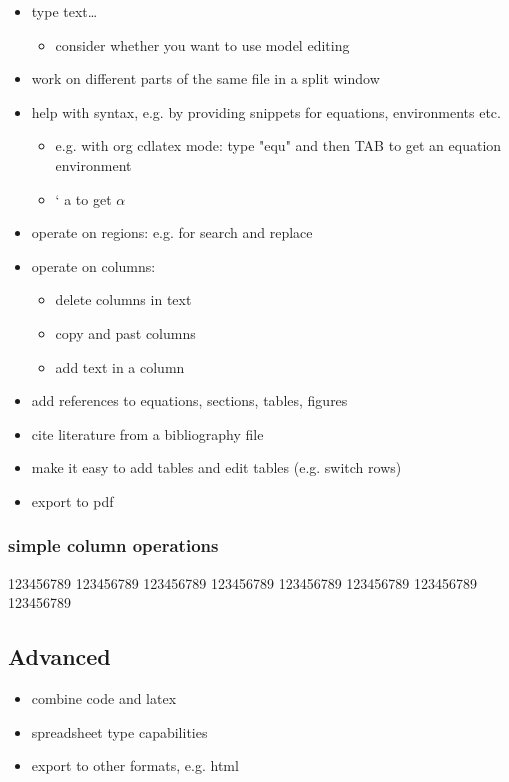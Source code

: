 \documentclass[11pt]{article}
\begin{document}
\begin{itemize}
\item type text\ldots{}
\begin{itemize}
\item consider whether you want to use model editing
\end{itemize}
\item work on different parts of the same file in a split window
\item help with syntax, e.g. by providing snippets for equations, environments etc.
\begin{itemize}
\item e.g. with org cdlatex mode: type "equ" and then TAB to get an equation environment
\item ` a to get \(\alpha\)
\end{itemize}
\item operate on regions: e.g. for search and replace
\item operate on columns:
\begin{itemize}
\item delete columns in text
\item copy and past columns
\item add text in a column
\end{itemize}
\item add references to equations, sections, tables, figures
\item cite literature from a bibliography file
\item make it easy to add tables and edit tables (e.g. switch rows)
\item export to pdf
\end{itemize}


\subsubsection{simple column operations}
\label{sec:org0e2da97}

123456789
123456789
123456789
123456789
123456789
123456789
123456789
123456789


\subsection{Advanced}
\label{sec:org6643182}

\begin{itemize}
\item combine code and latex
\item spreadsheet type capabilities
\item export to other formats, e.g. html
\end{itemize}
\end{document}

